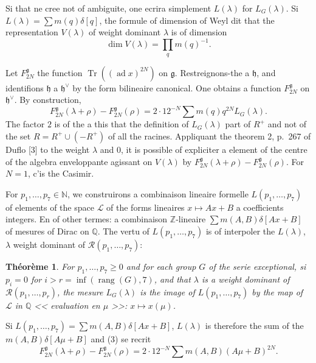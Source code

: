 \documentclass[11pt,a4paper]{article}
\theoremstyle{plain}
\newtheorem{theorem}{Th\'eor\`eme}
\theoremstyle{definition}
\DeclareMathOperator{\Tr}{Tr}
\DeclareMathOperator{\ad}{ad}
\DeclareMathOperator{\rank}{rang}
\newcommand{\rang}{\rank}
\begin{document}
Si that ne cree not of ambiguite, one ecrira simplement $L(\lambda)$ for $L_G(\lambda)$. Si $L(\lambda) = \sum m(q)\delta[q]$, the formule of dimension of Weyl dit that the representation $V(\lambda)$ of weight dominant $\lambda$ is of dimension
\begin{equation}\label{eq:2}
\dim V(\lambda) = \prod_q m(q)^{-1}.
\end{equation}

Let $F_{2N}^{\mathfrak{g}}$ the function $\Tr((\ad x)^{2N})$ on $\mathfrak{g}$. Restreignons-the a $\mathfrak{h}$, and identifions $\mathfrak{h}$ a $\mathfrak{h}^\vee$ by the form bilineaire canonical. One obtains a function $F_{2N}^{\mathfrak{g}}$ on $\mathfrak{h}^\vee$. By construction,
\begin{equation}\label{eq:3}
F_{2N}^{\mathfrak{g}}(\lambda + \rho) - F_{2N}^{\mathfrak{g}}(\rho) = 2 \cdot 12^{-N} \sum m(q) q^{2N} L_G(\lambda).
\end{equation}
The factor $2$ is of the a this that the definition of $L_G(\lambda)$ part of $R^+$ and not of the set $R = R^+ \cup (-R^+)$ of all the racines. Appliquant the theorem 2, p.~267 of Duflo [3] to the weight $\lambda$ and $0$, it is possible of expliciter a element of the centre of the algebra enveloppante agissant on $V(\lambda)$ by $F_{2N}^{\mathfrak{g}}(\lambda+\rho) - F_{2N}^{\mathfrak{g}}(\rho)$. For $N = 1$, c'is the Casimir.

\smallskip

For $p_1,\dots,p_7 \in \mathbb{N}$, we construirons a combinaison lineaire formelle $L(p_1,\dots,p_7)$ of elements of the space $\mathcal{L}$ of the forms lineaires $x \mapsto Ax + B$ a coefficients integers. En of other termes: a combinaison $\mathbb{Z}$-lineaire $\sum m(A,B)\delta[Ax + B]$ of mesures of Dirac on $\mathbb{Q}$. The vertu of $L(p_1,\dots,p_7)$ is of interpoler the $L(\lambda)$, $\lambda$ weight dominant of $\mathcal{R}(p_1,\dots,p_7)$:

\begin{theorem}\label{thm:1}
For $p_1,\dots,p_7 \geq 0$ and for each group $G$ of the serie exceptional, si $p_i = 0$ for $i > r = \inf(\rang(G),7)$, and that $\lambda$ is a weight dominant of $\mathcal{R}(p_1,\dots,p_r)$, the mesure $L_G(\lambda)$ is the image of $L(p_1,\dots,p_7)$ by the map of $\mathcal{L}$ in $\mathbb{Q}$ << evaluation en $\mu$ >>: $x \mapsto x(\mu)$.
\end{theorem}

Si $L(p_1,\dots,p_7) = \sum m(A,B)\delta[Ax + B]$, $L(\lambda)$ is therefore the sum of the $m(A,B)\delta[A\mu + B]$ and (3) se recrit
\begin{equation}\label{eq:4}
F_{2N}^{\mathfrak{g}}(\lambda + \rho) - F_{2N}^{\mathfrak{g}}(\rho) = 2 \cdot 12^{-N} \sum m(A,B) (A\mu + B)^{2N}.
\end{equation}
\end{document}
